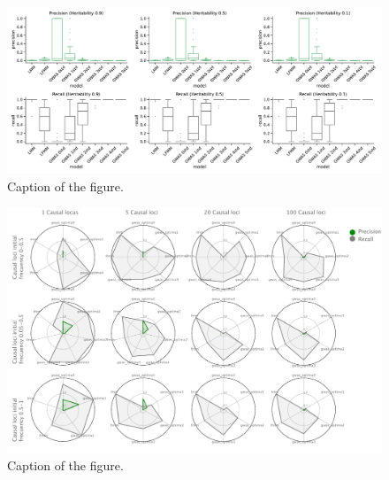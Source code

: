 \documentclass{article}
\begin{document}
\begin{figure}[b]
    \centering
    \includegraphics[width=1\textwidth]{figures/metrics_boxplots-1.pdf}
    \caption{Caption of the figure.}
    \label{fig:metrics_boxplots}
\end{figure}

\begin{figure}[b]
    \centering
    \includegraphics[width=1\textwidth]{figures/metrics.pdf}
    \caption{Caption of the figure.}
    \label{fig:metrics}
\end{figure}


\end{document}
